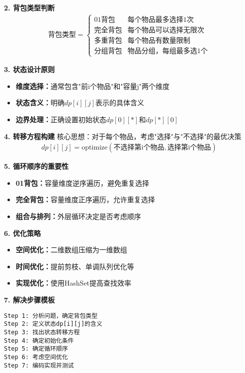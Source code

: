 \textbf{2. 背包类型判断}
\begin{align}
\text{背包类型} = \begin{cases}
\text{01背包} & \text{每个物品最多选择1次} \\
\text{完全背包} & \text{每个物品可以选择无限次} \\
\text{多重背包} & \text{每个物品有数量限制} \\
\text{分组背包} & \text{物品分组，每组最多选1个}
\end{cases}
\end{align}

\textbf{3. 状态设计原则}
\begin{itemize}
\item \textbf{维度选择：}通常包含"前i个物品"和"容量j"两个维度
\item \textbf{状态含义：}明确$dp[i][j]$表示的具体含义
\item \textbf{边界处理：}正确设置初始状态$dp[0][*]$和$dp[*][0]$
\end{itemize}

\textbf{4. 转移方程构建}
核心思想：对于每个物品，考虑"选择"与"不选择"的最优决策
\begin{align}
dp[i][j] = \text{optimize}(\text{不选择第i个物品}, \text{选择第i个物品})
\end{align}

\textbf{5. 循环顺序的重要性}
\begin{itemize}
\item \textbf{01背包：}容量维度逆序遍历，避免重复选择
\item \textbf{完全背包：}容量维度正序遍历，允许重复选择
\item \textbf{组合与排列：}外层循环决定是否考虑顺序
\end{itemize}

\textbf{6. 优化策略}
\begin{itemize}
\item \textbf{空间优化：}二维数组压缩为一维数组
\item \textbf{时间优化：}提前剪枝、单调队列优化等
\item \textbf{实现优化：}使用HashSet提高查找效率
\end{itemize}

\textbf{7. 解决步骤模板}
\begin{verbatim}
Step 1: 分析问题，确定背包类型
Step 2: 定义状态dp[i][j]的含义
Step 3: 找出状态转移方程
Step 4: 确定初始化条件
Step 5: 确定循环顺序
Step 6: 考虑空间优化
Step 7: 编码实现并测试
\end{verbatim}

